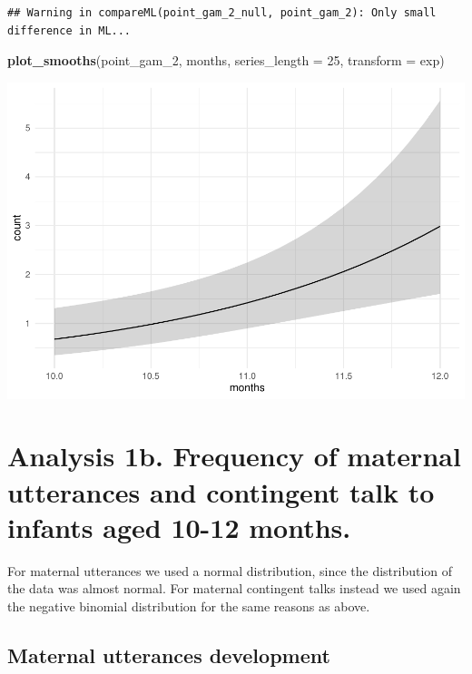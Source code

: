 \documentclass[]{article}
\newenvironment{Shaded}{\begin{snugshade}}{\end{snugshade}}
\newcommand{\DataTypeTok}[1]{\textcolor[rgb]{0.13,0.29,0.53}{#1}}
\newcommand{\DecValTok}[1]{\textcolor[rgb]{0.00,0.00,0.81}{#1}}
\newcommand{\KeywordTok}[1]{\textcolor[rgb]{0.13,0.29,0.53}{\textbf{#1}}}
\newcommand{\NormalTok}[1]{#1}
\begin{document}
\begin{verbatim}
## Warning in compareML(point_gam_2_null, point_gam_2): Only small difference in ML...
\end{verbatim}

\begin{Shaded}
\begin{Highlighting}[]
\KeywordTok{plot_smooths}\NormalTok{(point_gam_}\DecValTok{2}\NormalTok{, months, }\DataTypeTok{series_length =} \DecValTok{25}\NormalTok{, }\DataTypeTok{transform =}\NormalTok{ exp)}
\end{Highlighting}
\end{Shaded}

\includegraphics{supplement_files/figure-latex/point-gam-2-plot-1.pdf}

\newpage

\hypertarget{analysis-1b.-frequency-of-maternal-utterances-and-contingent-talk-to-infants-aged-10-12-months.}{%
\section{Analysis 1b. Frequency of maternal utterances and contingent
talk to infants aged 10-12
months.}\label{analysis-1b.-frequency-of-maternal-utterances-and-contingent-talk-to-infants-aged-10-12-months.}}

For maternal utterances we used a normal distribution, since the
distribution of the data was almost normal. For maternal contingent
talks instead we used again the negative binomial distribution for the
same reasons as above.

\hypertarget{maternal-utterances-development}{%
\subsection{Maternal utterances
development}\label{maternal-utterances-development}}
\end{document}
